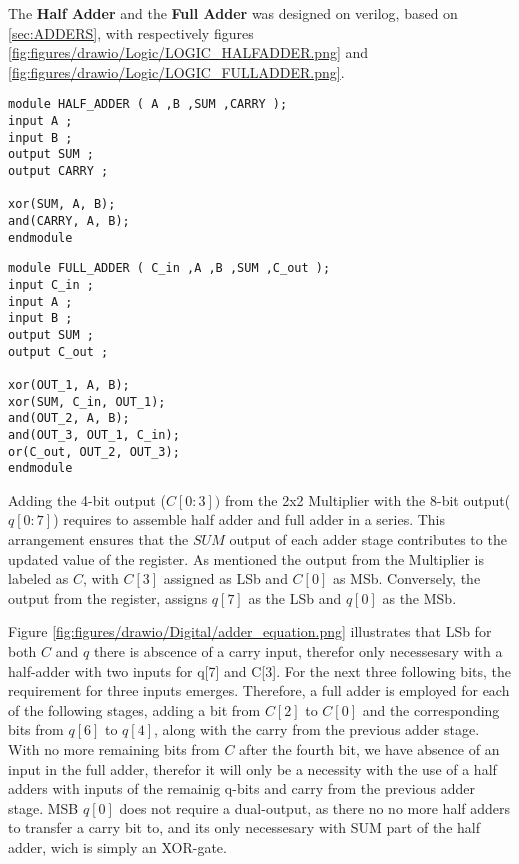 The \textbf{Half Adder} and the \textbf{Full Adder} was designed on verilog, based on \ref{sec:ADDERS}, with respectively figures \ref{fig:figures/drawio/Logic/LOGIC_HALFADDER.png} and \ref{fig:figures/drawio/Logic/LOGIC_FULLADDER.png}.
\begin{lstlisting}
module HALF_ADDER ( A ,B ,SUM ,CARRY );
input A ;
input B ;
output SUM ;
output CARRY ;

xor(SUM, A, B);
and(CARRY, A, B);
endmodule
\end{lstlisting}
\begin{lstlisting}
module FULL_ADDER ( C_in ,A ,B ,SUM ,C_out );
input C_in ;
input A ;
input B ;
output SUM ;
output C_out ;

xor(OUT_1, A, B);
xor(SUM, C_in, OUT_1);
and(OUT_2, A, B);
and(OUT_3, OUT_1, C_in);
or(C_out, OUT_2, OUT_3);
endmodule
\end{lstlisting}

Adding the 4-bit output ($C[0:3])$ from the 2x2 Multiplier with the 8-bit output($q[0:7]$) requires to assemble half adder and full adder in a series. This arrangement ensures that the $SUM$ output of each adder stage contributes to the updated value of the register. As mentioned the output from the Multiplier is labeled as $C$, with $C[3]$ assigned as LSb and $C[0]$ as MSb. Conversely, the output from the register, assigns $q[7]$ as the LSb and $q[0]$ as the MSb.


Figure \ref{fig:figures/drawio/Digital/adder_equation.png} illustrates that LSb for both $C$ and $q$ there is abscence of a carry input, therefor only necessesary with a half-adder with two inputs for q[7] and C[3]. For the next three following bits, the requirement for three inputs emerges. Therefore, a full adder is employed for each of the following stages, adding a bit from $C[2]$ to $C[0]$ and the corresponding bits from $q[6]$ to $q[4]$, along with the carry from the previous adder stage. With no more remaining bits from $C$ after the fourth bit, we have absence of an input in the full adder, therefor it will only be a necessity with the use of a half adders with inputs of the remainig q-bits and carry from the previous adder stage. MSB $q[0]$ does not require a dual-output, as there no no more half adders to transfer a carry bit to, and its only necessesary with SUM part of the half adder, wich is simply an XOR-gate.

